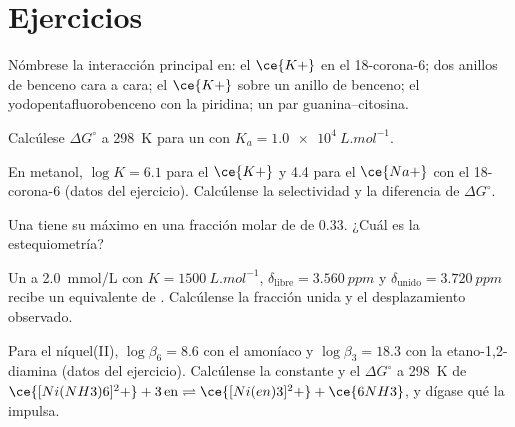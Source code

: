 \section{Ejercicios}

\begin{exercise}[$\star$]\label{exo:b3:supramolecular:1}
Nómbrese la interacción principal en: el $\ce{K+}$ en el 18-corona-6; dos anillos de benceno cara a cara;
el $\ce{K+}$ sobre un anillo de benceno; el yodopentafluorobenceno con la piridina; un par
guanina--citosina.
\end{exercise}

\begin{exercise}[$\star$]\label{exo:b3:supramolecular:2}
Calcúlese $\Delta G^\circ$ a \qty{298}{K} para un  con $K_a = \qty{1.0e4}{L.mol^{-1}}$.
\end{exercise}

\begin{exercise}[$\star$]\label{exo:b3:supramolecular:3}
En metanol, $\log K = 6.1$ para el $\ce{K+}$ y 4.4 para el $\ce{Na+}$ con el 18-corona-6 (datos del ejercicio).
Calcúlense la selectividad y la diferencia de $\Delta G^\circ$.
\end{exercise}

\begin{exercise}[$\star$]\label{exo:b3:supramolecular:4}
Una  tiene su máximo en una fracción molar de  de 0.33. ¿Cuál es la estequiometría?
\end{exercise}

\begin{exercise}[$\star\star$]\label{exo:b3:supramolecular:5}
Un  a \qty{2.0}{mmol/L} con $K = \qty{1500}{L.mol^{-1}}$, $\delta_{\mathrm{libre}} = \qty{3.560}{ppm}$ y $\delta_{\mathrm{unido}} = \qty{3.720}{ppm}$ recibe un
equivalente de . Calcúlense la fracción unida y el desplazamiento observado.
\end{exercise}

\begin{exercise}[$\star\star$]\label{exo:b3:supramolecular:6}
Para el níquel(II), $\log\beta_6 = 8.6$ con el amoníaco y $\log\beta_3 = 18.3$ con la etano-1,2-diamina (datos del
ejercicio). Calcúlense la constante y el $\Delta G^\circ$ a \qty{298}{K} de
$\ce{[Ni(NH3)6]^2+} + 3\,\mathrm{en} \rightleftharpoons \ce{[Ni(en)3]^2+} + \ce{6NH3}$, y dígase qué la impulsa.
\end{exercise}

